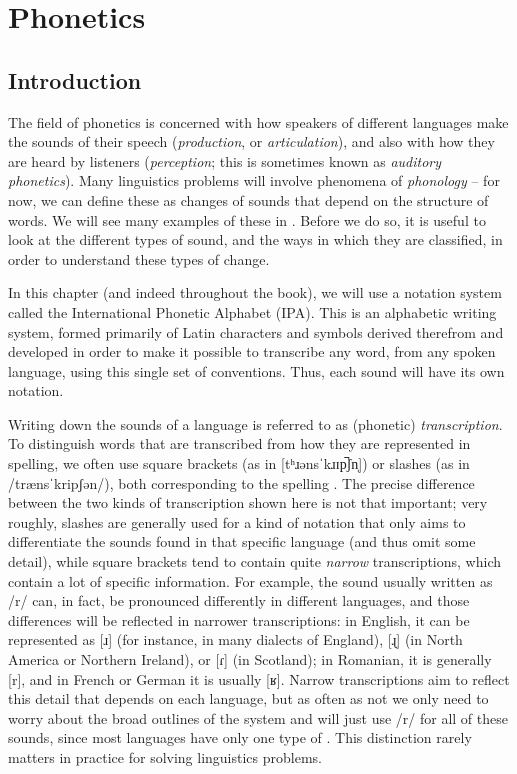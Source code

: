 \begin{refsection}
\hypertarget{phonetics}{%
\chapter{Phonetics}\label{chap-phonetics}}

\section{Introduction}

The field of phonetics is concerned with how speakers of different languages make the sounds of their speech (\textit{production}, or \textit{articulation}), and also with how they are heard by listeners (\textit{perception}; this is sometimes known as \textit{auditory phonetics}). Many linguistics problems will involve phenomena of \textit{phonology} – for now, we can define these as changes of sounds that depend on the structure of words. We will see many examples of these in . Before we do so, it is useful to look at the different types of sound, and the ways in which they are classified, in order to understand these types of change. 

In this chapter (and indeed throughout the book), we will use a notation system called the International Phonetic Alphabet (IPA). This is an alphabetic writing system, formed primarily of Latin characters and symbols derived therefrom and developed in order to make it possible to transcribe any word, from any spoken language, using this single set of conventions. Thus, each sound will have its own notation.

Writing down the sounds of a language is referred to as (phonetic) \textit{transcription}. To distinguish words that are transcribed from how they are represented in spelling, we often use square brackets (as in [tʰɹənsˈkɹɪp̚ʃn̩]) or slashes (as in /trænsˈkripʃən/), both corresponding to the spelling . The precise difference between the two kinds of transcription shown here is not that important; very roughly, slashes are generally used for a kind of notation that only aims to differentiate the sounds found in that specific language (and thus omit some detail), while square brackets tend to contain quite \textit{narrow} transcriptions, which contain a lot of specific information. For example, the sound usually written as /r/ can, in fact, be pronounced differently in different languages, and those differences will be reflected in narrower transcriptions: in English, it can be represented as [ɹ] (for instance, in many dialects of England), [ɻ] (in North America or Northern Ireland), or [ɾ] (in Scotland); in Romanian, it is generally [r], and in French or German it is usually [ʁ]. Narrow transcriptions aim to reflect this detail that depends on each language, but as often as not we only need to worry about the broad outlines of the system and will just use /r/ for all of these sounds, since most languages have only one type of . This distinction rarely matters in practice for solving linguistics problems.


\end{refsection}
